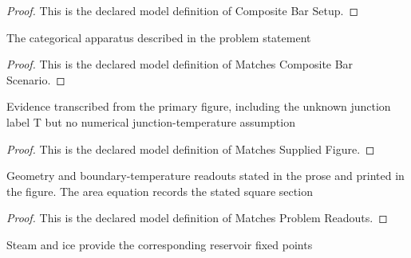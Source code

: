 \begin{proof}
  This is the declared model definition of Composite Bar Setup.
\end{proof}
\begin{definition}
  \label{def:physics:phyx-mini-0467:phyxminiproblems-problemphyxmini0467-matchescompositebarscenario}
  The categorical apparatus described in the problem statement
\end{definition}
\begin{proof}
  This is the declared model definition of Matches Composite Bar Scenario.
\end{proof}
\begin{definition}
  \label{def:physics:phyx-mini-0467:phyxminiproblems-problemphyxmini0467-matchessuppliedfigure}
  Evidence transcribed from the primary figure, including the unknown junction label T but no numerical junction-temperature assumption
\end{definition}
\begin{proof}
  This is the declared model definition of Matches Supplied Figure.
\end{proof}
\begin{definition}
  \label{def:physics:phyx-mini-0467:phyxminiproblems-problemphyxmini0467-matchesproblemreadouts}
  Geometry and boundary-temperature readouts stated in the prose and printed in the figure. The area equation records the stated square section
\end{definition}
\begin{proof}
  This is the declared model definition of Matches Problem Readouts.
\end{proof}
\begin{definition}
  \label{def:physics:phyx-mini-0467:phyxminiproblems-problemphyxmini0467-usessteamandicefixedpoints}
  Steam and ice provide the corresponding reservoir fixed points
\end{definition}
